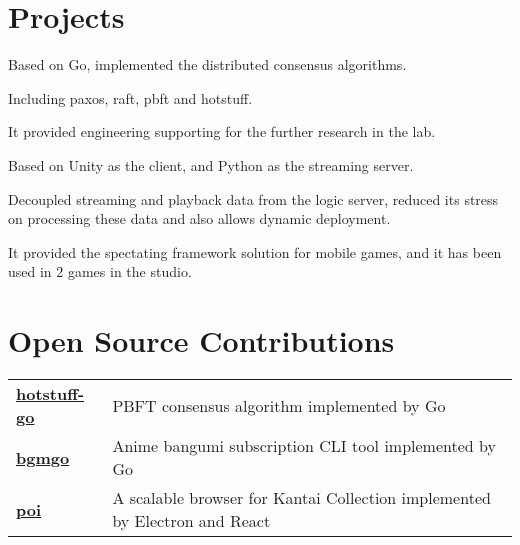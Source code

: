 \documentclass[]{deedy-resume-openfont}
\begin{document}
\begin{minipage}[t]{0.73\textwidth}

\section{Projects}
\sectionsep

\begin{tightemize}
    \item Based on Go, implemented the distributed consensus algorithms.
    \item Including paxos, raft, pbft and hotstuff.
    \item It provided engineering supporting for the further research in the lab.
    \end{tightemize}
\sectionsep

\begin{tightemize}
    \item Based on Unity as the client, and Python as the streaming server.
    \item Decoupled streaming and playback data from the logic server, reduced its stress on processing these data and also allows dynamic deployment.
    \item It provided the spectating framework solution for mobile games, and it has been used in 2 games in the studio.
    \end{tightemize}
\sectionsep



\section{Open Source Contributions}
\begin{tabular}{ll}
    \href{https://github.com/myzWILLmake/pbft-go}{\bf hotstuff-go} & PBFT consensus algorithm implemented by Go \\
    \href{https://github.com/myzWILLmake/bgmgo}{\bf bgmgo} &  Anime bangumi subscription CLI tool implemented by Go \\
    \href{https://github.com/poooi/poi}{\bf poi} &  A scalable browser for Kantai Collection implemented by Electron and React \\
\end{tabular}
\sectionsep


\end{minipage}
\end{document}
